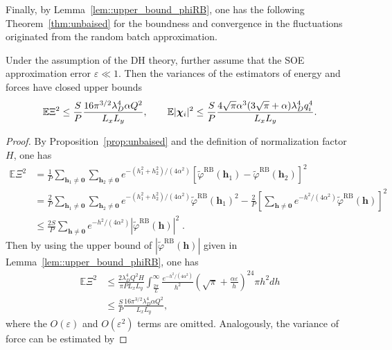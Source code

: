 Finally, by Lemma~\ref{lem::upper_bound_phiRB}, one has the following Theorem~\ref{thm:unbaised} for the boundness and convergence in the fluctuations originated from the random batch approximation.
\begin{thm}\label{thm:unbaised}
	Under the assumption of the DH theory, further assume that the SOE approximation error $\varepsilon\ll 1$. 
	Then the variances of the estimators of energy and forces have closed upper bounds
	\begin{equation}
		\mathbb{E}\Xi^2\leq \frac{S}{P}\frac{16\pi^{3/2}\lambda_D^4\alpha Q^2}{L_xL_y},\quad \quad \mathbb{E}|\boldsymbol{\chi}_{i}|^2\leq\frac{S}{P}\frac{4\sqrt{\pi}\alpha^3(3\sqrt{\pi}+\alpha)\lambda_D^4 q_{i}^4}{L_xL_y}.
	\end{equation}
\end{thm}
\begin{proof}
	By Proposition~\ref{prop:unbaised} and the definition of normalization factor $H$, one has
	\begin{equation}
		\begin{split}
			\mathbb{E}\Xi^2
			& = \frac{1}{P}\sum_{\bm{h}_1\neq \bm{0}}\sum_{\bm{h}_2\neq \bm{0}}e^{-(h_1^2+h_2^2)/(4\alpha^2)}\left[\widetilde{\varphi}^{\text{RB}}(\bm{h}_1)-\widetilde{\varphi}^{\text{RB}}(\bm{h}_2)\right]^2\\
			& = \frac{2}{P}\sum_{\bm{h}_1\neq \bm{0}}\sum_{\bm{h}_2\neq \bm{0}}e^{-(h_1^2+h_2^2)/(4\alpha^2)} \widetilde{\varphi}^{\text{RB}}(\bm{h}_1)^2 - \frac{2}{P} \left[ \sum_{\bm{h}\neq \bm{0}} e^{-h^2 /(4\alpha^2)} \widetilde{\varphi}^{\text{RB}}(\bm{h}) \right]^2\\
			& \leq \frac{2S}{P}\sum_{\bm{h}\neq\bm{0}}e^{-h^2/(4\alpha^2)}\left|\widetilde{\varphi}^{\text{RB}}(\bm{h})\right|^2\;.
		\end{split}
	\end{equation}
	Then by using the upper bound of $\left|\widetilde{\varphi}^{\text{RB}}(\bm{h})\right|$ given in Lemma~\ref{lem::upper_bound_phiRB}, one has 
	\begin{equation}
		\begin{split}
			\mathbb{E}\Xi^2&\leq \frac{2\lambda_D^4Q^2H}{\pi PL_xL_y}\int_{\frac{2\pi}{L}}^{\infty}\frac{e^{-h^2/(4\alpha^2)}}{h^2}\left(\sqrt{\pi}+\frac{\alpha \varepsilon}{h}\right)^24\pi h^2dh\\
			&\leq \frac{S}{P}\frac{16\pi^{3/2}\lambda_D^4\alpha Q^2}{L_xL_y},
		\end{split}
	\end{equation}
	where the $O(\varepsilon)$ and $O(\varepsilon^2)$ terms are omitted. Analogously, the variance of force can be estimated by

\end{proof}
